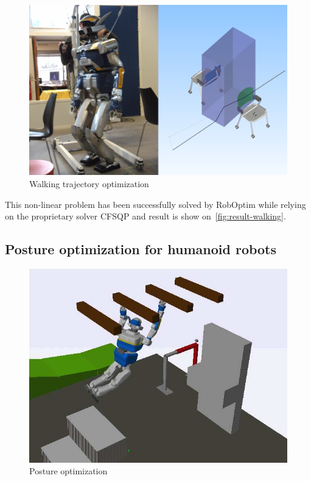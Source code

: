\documentclass[conference,final,a4paper,twocolumn,9pt]{IEEEtran}
\begin{document}
\begin{figure}
  \begin{center}
    \includegraphics[width=\linewidth]{hrp2-two-chairs.png}
    \caption{Walking trajectory optimization\label{fig:result-walking}}
  \end{center}
\end{figure}


This non-linear problem has been successfully solved by RobOptim while
relying on the proprietary solver CFSQP and result is show
on~\autoref{fig:result-walking}.


\subsection{Posture optimization for humanoid robots}


\begin{figure}
  \begin{center}
    \includegraphics[width=\linewidth]{agent-067.jpg}
    \caption{Posture optimization\label{fig:stence-optimization}}
  \end{center}
\end{figure}
\end{document}
